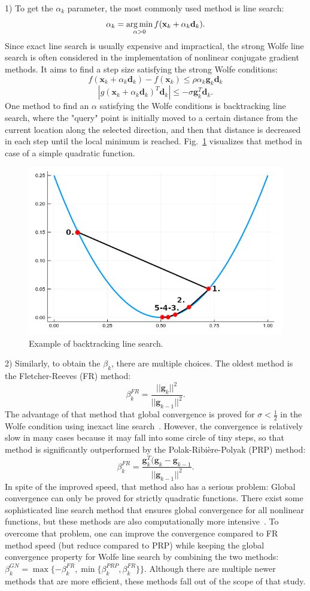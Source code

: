 1) To get the $\alpha_k$ parameter, the most commonly used method is line search:
$$\alpha_k = \operatorname*{arg\,min}_{\alpha > 0} f(\mathbf{x}_k + \alpha_k \mathbf{d}_k).$$
Since exact line search is usually expensive and impractical, the strong Wolfe line search is often considered in the implementation of nonlinear conjugate gradient methods. It aims to find a step size satisfying the strong Wolfe conditions:
$$f(\mathbf{x}_k + \alpha_k \mathbf{d}_k) - f(\mathbf{x}_k) \leq \rho \alpha_k \mathbf{g}_k \mathbf{d}_k$$
$$|g(\mathbf{x}_k + \alpha_k \mathbf{d}_k)^T \mathbf{d}_k| \leq - \sigma \mathbf{g}_k^T \mathbf{d}_k.$$
One method to find an $\alpha$ satisfying the Wolfe conditions is backtracking line search, where the "query" point is initially moved to a certain distance from the current location along the selected direction, and then that distance is decreased in each step until the local minimum is reached.
Fig.~\ref{fig:backtracking} visualizes that method in case of a simple quadratic function.

\begin{figure}
    \centering
    \includegraphics[width=0.3\linewidth]{images/project with Wiem/backtracking.png}
    \caption{Example of backtracking line search.}
    \label{fig:backtracking}
\end{figure}

2) Similarly, to obtain the $\beta_k$, there are multiple choices. The oldest method is the Fletcher-Reeves (FR) method:
$$\beta_k^{FR} = \frac{||\mathbf{g}_k||^2}{||\mathbf{g}_{k-1}||^2}.$$
The advantage of that method that global convergence is proved for $\sigma < \frac{1}{2}$ in the Wolfe condition using inexact line search~\cite{Al-Baali}. However, the convergence is relatively slow in many cases because it may fall into some circle of tiny steps, so that method is significantly outperformed by the Polak-Ribi\`{e}re-Polyak (PRP) method:
$$\beta_k^{FR} = \frac{\mathbf{g}_k^T (\mathbf{g}_k - \mathbf{g}_{k-1}}{||\mathbf{g}_{k-1}||^2}.$$
In spite of the improved speed, that method also has a serious problem: Global convergence can only be proved for strictly quadratic functions. There exist some sophisticated line search method that ensures global convergence for all nonlinear functions, but these methods are also computationally more intensive~\cite{grippo}.
To overcome that problem, one can improve the convergence compared to FR method speed (but reduce compared to PRP) while keeping the global convergence property for Wolfe line search by combining the two methods: $\beta_k^{GN} = \max\{-\beta_k^{FR}, \min\{\beta_k^{PRP},\beta_k^{FR}\}\}.$
Although there are multiple newer methods that are more efficient, these methods fall out of the scope of that study.

